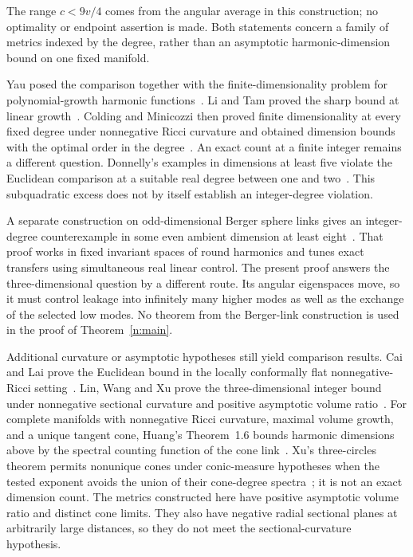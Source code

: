 The range \(c<9v/4\) comes from the angular average in this construction;
no optimality or endpoint assertion is made. Both statements concern a
family of metrics indexed by the degree, rather than an asymptotic
harmonic-dimension bound on one fixed manifold.

Yau posed the comparison together with the finite-dimensionality problem
for polynomial-growth harmonic functions~\cite{Yau,LiTam}. Li and Tam
proved the sharp bound at linear growth~\cite{LiTam}. Colding and Minicozzi
then proved finite dimensionality at every fixed degree under nonnegative
Ricci curvature and obtained dimension bounds with the optimal order in the
degree~\cite{ColdingMinicozzi97,ColdingMinicozzi98}. An exact count at a
finite integer remains a different question. Donnelly's examples in
dimensions at least five violate the Euclidean comparison at a suitable
real degree between one and two~\cite{Donnelly,CaiLai}. This subquadratic
excess does not by itself establish an integer-degree violation.

A separate construction on odd-dimensional Berger sphere links gives an
integer-degree counterexample in some even ambient dimension at least
eight~\cite[Theorem~1.1 and Section~7]{OpenAIBerger}. That proof works in fixed invariant
spaces of round harmonics and tunes exact transfers using simultaneous real
linear control. The present proof answers the three-dimensional question by
a different route. Its angular eigenspaces move, so it must control leakage
into infinitely many higher modes as well as the exchange of the selected
low modes. No theorem from the Berger-link construction is used in the proof
of Theorem~\ref{n:main}.

Additional curvature or asymptotic hypotheses still yield comparison
results. Cai and Lai prove the Euclidean bound in the locally conformally
flat nonnegative-Ricci setting~\cite{CaiLai}. Lin, Wang and Xu prove the
three-dimensional integer bound under nonnegative sectional curvature and
positive asymptotic volume ratio~\cite[Theorem~1.12]{LinWangXu}. For complete
manifolds with nonnegative Ricci curvature, maximal volume growth, and a
unique tangent cone, Huang's Theorem~1.6 bounds harmonic dimensions above by
the spectral counting function of the cone link~\cite{Huang}. Xu's
three-circles theorem permits nonunique cones under conic-measure hypotheses
when the tested exponent avoids the union of their cone-degree
spectra~\cite[Theorem~3.2]{Xu}; it is not an exact dimension count.
The metrics constructed here have positive asymptotic volume ratio and
distinct cone limits. They also have negative radial sectional planes at
arbitrarily large distances, so they do not meet the sectional-curvature
hypothesis.


